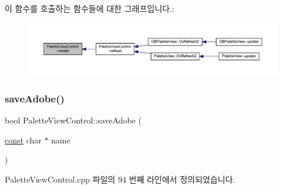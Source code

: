 이 함수를 호출하는 함수들에 대한 그래프입니다.\+:
\nopagebreak
\begin{figure}[H]
\begin{center}
\leavevmode
\includegraphics[width=350pt]{class_palette_view_control_adbcdd372f28027690355099e14b669d1_icgraph}
\end{center}
\end{figure}
\mbox{\label{class_palette_view_control_a14d553a87d89463719adcaa63f42a72b}} 
\subsubsection{\texorpdfstring{save\+Adobe()}{saveAdobe()}}
{\footnotesize\ttfamily bool Palette\+View\+Control\+::save\+Adobe (\begin{DoxyParamCaption}\item[{\mbox{\hyperlink{getopt1_8c_a2c212835823e3c54a8ab6d95c652660e}{const}} char $\ast$}]{name }\end{DoxyParamCaption})}



Palette\+View\+Control.\+cpp 파일의 94 번째 라인에서 정의되었습니다.


